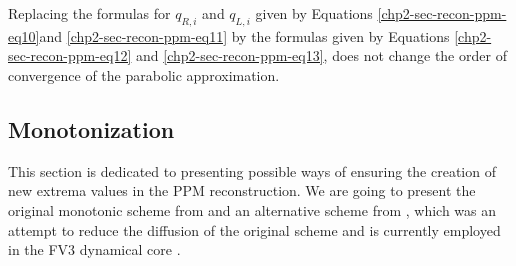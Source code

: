 \begin{remark}
	Replacing the formulas for $q_{R,i}$ and $q_{L,i}$ given by Equations
	\eqref{chp2-sec-recon-ppm-eq10}and \eqref{chp2-sec-recon-ppm-eq11}
	by the formulas given by Equations \eqref{chp2-sec-recon-ppm-eq12}
	and \eqref{chp2-sec-recon-ppm-eq13}, does not change the order of convergence
	of the parabolic approximation.
\end{remark}

\subsection{Monotonization}
	\label{chp2-sec-mono}
	This section is dedicated to presenting possible ways of ensuring the creation of new 
extrema values in the PPM reconstruction. We are going to present the original 
monotonic scheme from \citet{colella:1984} and an alternative scheme from \citet{lin:2004},
which was an attempt to reduce the diffusion of the original scheme \citet{colella:1984}
and is currently employed in the FV3 dynamical core \citep{harris:2021}.
		
